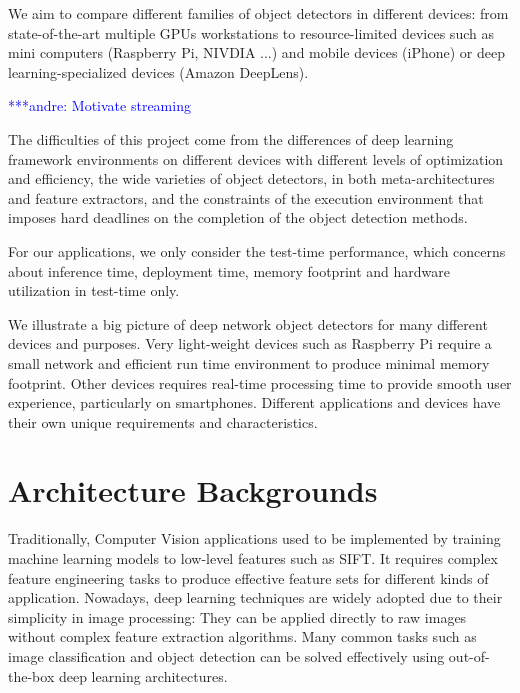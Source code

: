 \documentclass[conference]{IEEEtran}
\newcommand{\alnote}[1]{ {\textcolor{blue} { ***andre: #1 }}}
\newcommand{\alnote}[1]{}
\begin{document}
We aim to compare different families of object detectors in different devices: from state-of-the-art multiple GPUs workstations to resource-limited devices such as mini computers (Raspberry Pi, NIVDIA ...) and mobile devices (iPhone) or deep learning-specialized devices (Amazon DeepLens).


\alnote{Motivate streaming}

The difficulties of this project come from the differences of deep learning framework environments on different devices with different levels of optimization and efficiency, the wide varieties of object detectors, in both meta-architectures and feature extractors, and the constraints of the execution environment that imposes hard deadlines on the completion of the object detection methods.

For our applications, we only consider the test-time performance, which concerns about inference time, deployment time, memory footprint and hardware utilization in test-time only.

We illustrate a big picture of deep network object detectors for many different devices and purposes. Very light-weight devices such as Raspberry Pi require a small network and efficient run time environment to produce minimal memory footprint. Other devices requires real-time processing time to provide smooth user experience, particularly on smartphones. Different applications and devices have their own unique requirements and characteristics. 

\section{Architecture Backgrounds}

Traditionally, Computer Vision applications used to be implemented by training machine learning models to low-level features such as SIFT. It requires complex feature engineering tasks to produce effective feature sets for different kinds of application. Nowadays, deep learning techniques are widely adopted due to their simplicity in image processing: They can be applied directly to raw images without complex feature extraction algorithms. Many common tasks such as image classification and object detection can be solved effectively using out-of-the-box deep learning architectures.
\end{document}
